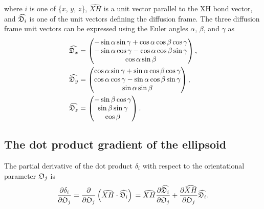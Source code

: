 \noindent where $i$ is one of \{$x$, $y$, $z$\}, $\widehat{XH}$ is a unit vector parallel to the XH bond vector, and $\widehat{\mathfrak{D}_i}$ is one of the unit vectors defining the diffusion frame.
The three diffusion frame unit vectors can be expressed using the Euler angles $\alpha$, $\beta$, and $\gamma$ as
\begin{subequations}
\begin{align}
    \widehat{\mathfrak{D}_x} &= \begin{pmatrix}
        -\sin \alpha \sin \gamma + \cos \alpha \cos \beta \cos \gamma \\
        -\sin \alpha \cos \gamma - \cos \alpha \cos \beta \sin \gamma \\
        \cos \alpha \sin \beta \\
    \end{pmatrix}, \\
    \widehat{\mathfrak{D}_y} &= \begin{pmatrix}
        \cos \alpha \sin \gamma + \sin \alpha \cos \beta \cos \gamma \\
        \cos \alpha \cos \gamma - \sin \alpha \cos \beta \sin \gamma \\
        \sin \alpha \sin \beta \\
    \end{pmatrix}, \\
    \widehat{\mathfrak{D}_z} &= \begin{pmatrix}
        -\sin \beta \cos \gamma \\
        \sin \beta \sin \gamma \\
        \cos \beta \\
    \end{pmatrix}.
\end{align}
\end{subequations}




\subsection{The dot product gradient of the ellipsoid}

The partial derivative of the dot product $\delta_i$ with respect to the orientational parameter $\mathfrak{O}_j$ is
\begin{equation}
    \frac{\partial \delta_i}{\partial \mathfrak{O}_j}
        = \frac{\partial}{\partial \mathfrak{O}_j} \left( \widehat{XH} \cdot \widehat{\mathfrak{D}_i} \right) \\
        = \widehat{XH} \frac{\partial \widehat{\mathfrak{D}_i}}{\partial \mathfrak{O}_j}  +  \frac{\partial \widehat{XH}}{\partial \mathfrak{O}_j} \widehat{\mathfrak{D}_i}.
\end{equation}

